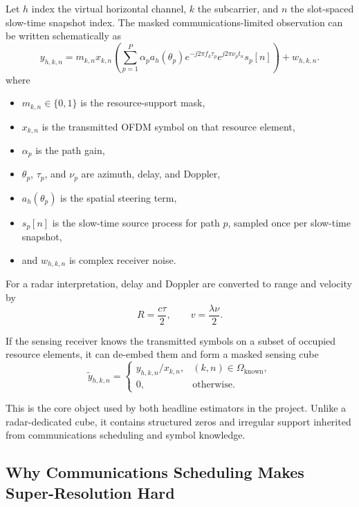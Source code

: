 \documentclass[11pt]{article}
\begin{document}
Let $h$ index the virtual horizontal channel, $k$ the subcarrier, and $n$ the slot-spaced slow-time snapshot index. The masked communications-limited observation can be written schematically as
\begin{equation}
y_{h,k,n}
=
m_{k,n} x_{k,n}
\left(
\sum_{p=1}^{P}
\alpha_p
a_h(\theta_p)
e^{-j 2 \pi f_k \tau_p}
e^{j 2 \pi \nu_p t_n}
s_p[n]
\right)
+ w_{h,k,n}.
\end{equation}
where
\begin{itemize}
  \item $m_{k,n} \in \{0,1\}$ is the resource-support mask,
  \item $x_{k,n}$ is the transmitted OFDM symbol on that resource element,
  \item $\alpha_p$ is the path gain,
  \item $\theta_p$, $\tau_p$, and $\nu_p$ are azimuth, delay, and Doppler,
  \item $a_h(\theta_p)$ is the spatial steering term,
  \item $s_p[n]$ is the slow-time source process for path $p$, sampled once per slow-time snapshot,
  \item and $w_{h,k,n}$ is complex receiver noise.
\end{itemize}

For a radar interpretation, delay and Doppler are converted to range and velocity by
\begin{equation}
R = \frac{c \tau}{2},
\qquad
v = \frac{\lambda \nu}{2}.
\end{equation}

If the sensing receiver knows the transmitted symbols on a subset of occupied resource elements, it can de-embed them and form a masked sensing cube
\begin{equation}
\tilde{y}_{h,k,n}
=
\begin{cases}
y_{h,k,n} / x_{k,n}, & (k,n) \in \Omega_{\mathrm{known}}, \\
0, & \text{otherwise}.
\end{cases}
\end{equation}

This is the core object used by both headline estimators in the project. Unlike a radar-dedicated cube, it contains structured zeros and irregular support inherited from communications scheduling and symbol knowledge.

\subsection{Why Communications Scheduling Makes Super-Resolution Hard}
\end{document}
